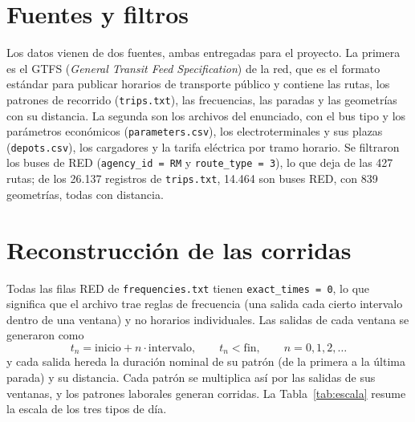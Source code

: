 
\section{Fuentes y filtros}
\label{sec:fuentes}

Los datos vienen de dos fuentes, ambas entregadas para el proyecto. La primera es el GTFS (\emph{General Transit Feed Specification}) de la red, que es el formato estándar para publicar horarios de transporte público y contiene las rutas, los patrones de recorrido (\texttt{trips.txt}), las frecuencias, las paradas y las geometrías con su distancia. La segunda son los archivos del enunciado, con el bus tipo y los parámetros económicos (\texttt{parameters.csv}), los electroterminales y sus plazas (\texttt{depots.csv}), los cargadores y la tarifa eléctrica por tramo horario. Se filtraron los buses de RED (\texttt{agency\_id = RM} y \texttt{route\_type = 3}), lo que deja \RutasLaboral{} de las 427 rutas; de los 26.137 registros de \texttt{trips.txt}, 14.464 son buses RED, con 839 geometrías, todas con distancia. %

\section{Reconstrucción de las corridas}
\label{sec:reconstruccion}

Todas las filas RED de \texttt{frequencies.txt} tienen \texttt{exact\_times = 0}, lo que significa que el archivo trae reglas de frecuencia (una salida cada cierto intervalo dentro de una ventana) y no horarios individuales. Las salidas de cada ventana se generaron como
\begin{equation}
t_n = \text{inicio} + n\cdot\text{intervalo},\qquad t_n < \text{fin},\qquad n = 0,1,2,\dots %
\label{eq:salidas}
\end{equation}
y cada salida hereda la duración nominal de su patrón (de la primera a la última parada) y su distancia. Cada patrón se multiplica así por las salidas de sus ventanas, y los \PatronesLaboral{} patrones laborales generan \CorridasLaboral{} corridas. La Tabla~\ref{tab:escala} resume la escala de los tres tipos de día.

